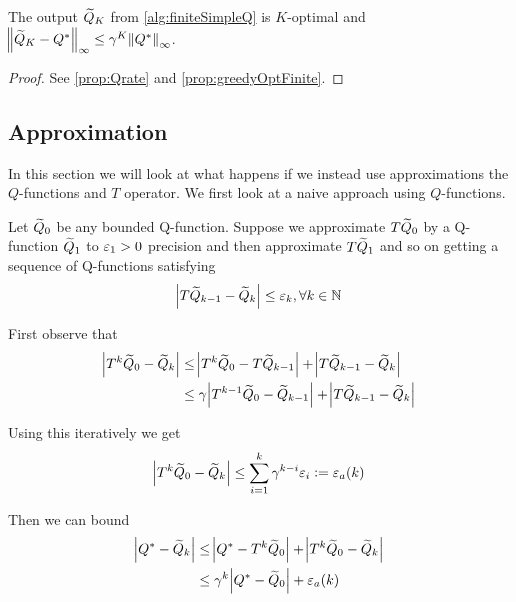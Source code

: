 \begin{prop}
  The output $\widetilde{Q}_K$ from \cref{alg:finiteSimpleQ} is
  $K$-optimal and
  $\norm{\widetilde{Q}_K - Q^*}_\infty \leq \gamma^K \norm{Q^*}_\infty$.
\end{prop}
\begin{proof}
  See \cref{prop:Qrate} and \cref{prop:greedyOptFinite}.
\end{proof}



\subsection{Approximation}

In this section we will look at what happens if we
instead use approximations the $Q$-functions and $T$ operator.
We first look at a naive approach using $Q$-functions.

Let $\widetilde{Q}_0$ be any bounded Q-function.
Suppose we approximate $T\widetilde{Q}_0$ by a Q-function $\widetilde{Q}_1$
to $\varepsilon_1 > 0$ precision and then approximate $T\widetilde{Q}_1$ and so on
getting a sequence of Q-functions satisfying
\[ \abs{T\widetilde{Q}_{k-1} - \widetilde{Q}_k} \leq \varepsilon_k, \forall k \in \mathbb{N} \]

First observe that
\begin{align*}
  \abs{T^k \widetilde{Q}_0 - \widetilde{Q}_k}
  &\leq \abs{T^k \widetilde{Q}_0 - T \widetilde{Q}_{k-1}} + \abs{T\widetilde{Q}_{k-1} - \widetilde{Q}_k}
  \\ &\leq \gamma \abs{T^{k-1} \widetilde{Q}_0 - \widetilde{Q}_{k-1}}
  + \abs{T\widetilde{Q}_{k-1} - \widetilde{Q}_k}
\end{align*}

Using this iteratively we get
\[ \abs{T^k \widetilde{Q}_0 - \widetilde{Q}_k} \leq \sum_{i=1}^k \gamma^{k-i} \varepsilon_i
\vcentcolon= \varepsilon_a(k) \]

Then we can bound
\begin{align*}
  \abs{Q^* - \widetilde{Q}_k}
  &\leq \abs{Q^* - T^k \widetilde{Q}_0} + \abs{T^k \widetilde{Q}_0 - \widetilde{Q}_k}
  \\ &\leq \gamma^k \abs{Q^* - \widetilde{Q}_0}
  + \varepsilon_a(k)
\end{align*}

